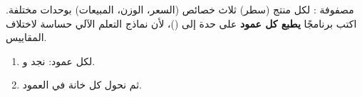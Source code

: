 \begin{statement}
مصفوفة : لكل منتج (سطر) ثلاث خصائص (السعر، الوزن، المبيعات) بوحدات مختلفة. اكتب برنامجًا \textbf{يطبع كل عمود} على حدة إلى \code{[0, 1]} ()، لأن نماذج التعلم الآلي حساسة لاختلاف المقاييس.
\end{statement}
\begin{stepsbox}\begin{enumerate}
\item لكل عمود: نجد  و.
\item ثم نحول كل خانة في العمود.
\end{enumerate}\end{stepsbox}
